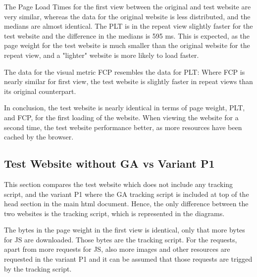 The Page Load Times for the first view between the original and test website are very similar, whereas the data for the original website is less distributed, and the medians are almost identical.
The PLT is in the repeat view slightly faster for the test website and the difference in the medians is 595 ms.
This is expected, as the page weight for the test website is much smaller than the original website for the repeat view, and a "lighter" website is more likely to load faster.




The data for the visual metric FCP resembles the data for PLT:
Where FCP is nearly similar for first view, the test website is slightly faster in repeat views than its original counterpart.




In conclusion, the test website is nearly identical in terms of page weight, PLT, and FCP, for the first loading of the website.
When viewing the website for a second time, the test website performance better, as more resources have been cached by the browser.



\subsection{Test Website without GA vs Variant P1}

This section compares the test website which does not include any tracking script, and the variant P1 where the GA tracking script is included at top of the head section in the main html document. 
Hence, the only difference between the two websites is the tracking script, which is represented in the diagrams.


The bytes in the page weight in the first view is identical, only that more bytes for JS are downloaded.
Those bytes are the tracking script.
For the requests, apart from more requests for JS, also more images and other resources are requested in the variant P1 and it can be assumed that those requests are trigged by the tracking script.



